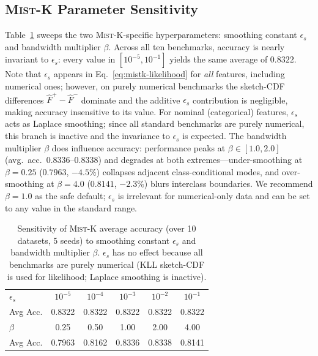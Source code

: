 \documentclass{article}
\newcommand{\mist}{\textsc{Mist}}
\begin{document}
\subsection{\mist{}-K Parameter Sensitivity}
\label{app:mistk-sensitivity}
Table~\ref{tab:mistk-sensitivity} sweeps the two \mist{}-K-specific
hyperparameters: smoothing constant $\epsilon_s$ and bandwidth multiplier
$\beta$. Across all ten benchmarks,
accuracy is nearly invariant to $\epsilon_s$: every value in
$[10^{-5}, 10^{-1}]$ yields the same average of $0.8322$.
Note that $\epsilon_s$ appears in Eq.~\eqref{eq:mistk-likelihood} for
\emph{all} features, including numerical ones; however, on purely numerical
benchmarks the sketch-CDF differences $\hat{F}^+ - \hat{F}^-$ dominate and
the additive $\epsilon_s$ contribution is negligible, making accuracy
insensitive to its value. For nominal (categorical) features, $\epsilon_s$
acts as Laplace smoothing; since all standard benchmarks are purely
numerical, this branch is inactive and the invariance to $\epsilon_s$ is
expected.
The bandwidth multiplier $\beta$ does influence accuracy: performance peaks
at $\beta \in [1.0, 2.0]$ (avg.\ acc.\ $0.8336$--$0.8338$) and
degrades at both extremes—under-smoothing at $\beta{=}0.25$ ($0.7963$,
$-4.5\%$) collapses adjacent class-conditional modes, and over-smoothing
at $\beta{=}4.0$ ($0.8141$, $-2.3\%$) blurs interclass boundaries.
We recommend $\beta{=}1.0$ as the safe default; $\epsilon_s$ is irrelevant
for numerical-only data and can be set to any value in the standard range.

\begin{table}[h]
\caption{Sensitivity of \mist{}-K average accuracy (over 10 datasets,
5 seeds) to smoothing constant $\epsilon_s$
and bandwidth multiplier $\beta$. $\epsilon_s$ has no effect because all
benchmarks are purely numerical (KLL sketch-CDF is used for likelihood;
Laplace smoothing is inactive).}
\label{tab:mistk-sensitivity}
\centering
\small
\begin{tabular}{lccccc}
\toprule
$\epsilon_s$ & $10^{-5}$ & $10^{-4}$ & $10^{-3}$ & $10^{-2}$ & $10^{-1}$ \\
Avg Acc.     & 0.8322    & 0.8322    & 0.8322    & 0.8322    & 0.8322    \\
\midrule
$\beta$  & 0.25   & 0.50   & 1.00   & 2.00   & 4.00   \\
Avg Acc. & 0.7963 & 0.8162 & 0.8336 & 0.8338 & 0.8141 \\
\bottomrule
\end{tabular}
\end{table}
\end{document}
